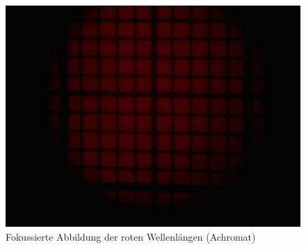 \begin{figure}[h!]
\begin{minipage}[t]{0.32\textwidth}
		\includegraphics[clip=true, trim=700px 950px 900px 250px, width=\linewidth]{img/ChromAbb/Prakt_Linsenfehler_2015_06_04_073}
		\caption{Fokussierte Abbildung der roten Wellenlängen (Achromat)}
		\label{fig:cm_rot_achromat}
	\end{minipage}
\end{figure}


